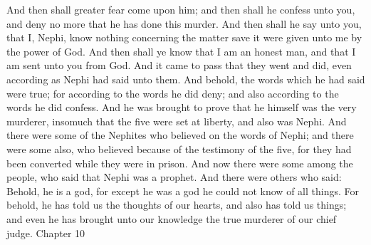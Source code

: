 And then shall greater fear come upon him; and then shall he confess unto you, and deny no more that he has done this murder.
\bverse \iffalse And then shall he say unto you, that I, Nephi, know nothing concerning the matter save it were given unto me by the power of God. And then shall ye know that I am an honest man, and that I am sent unto you from God. \fi
And then shall he say unto you, that I, Nephi, know nothing concerning the matter save it were given unto me by the power of God. And then shall ye know that I am an honest man, and that I am sent unto you from God.
\bverse \iffalse And it came to pass that they went and did, even according as Nephi had said unto them. And behold, the words which he had said were true; for according to the words he did deny; and also according to the words he did confess. \fi
And it came to pass that they went and did, even according as Nephi had said unto them. And behold, the words which he had said were true; for according to the words he did deny; and also according to the words he did confess.
\bverse \iffalse And he was brought to prove that he himself was the very murderer, insomuch that the five were set at liberty, and also was Nephi. \fi
And he was brought to prove that he himself was the very murderer, insomuch that the five were set at liberty, and also was Nephi.
\bverse \iffalse And there were some of the Nephites who believed on the words of Nephi; and there were some also, who believed because of the testimony of the five, for they had been converted while they were in prison. \fi
And there were some of the Nephites who believed on the words of Nephi; and there were some also, who believed because of the testimony of the five, for they had been converted while they were in prison.
\bverse \iffalse And now there were some among the people, who said that Nephi was a prophet. \fi
And now there were some among the people, who said that Nephi was a prophet.
\bverse \iffalse And there were others who said: Behold, he is a god, for except he was a god he could not know of all things. For behold, he has told us the thoughts of our hearts, and also has told us things; and even he has brought unto our knowledge the true murderer of our chief judge. \fi
And there were others who said: Behold, he is a god, for except he was a god he could not know of all things. For behold, he has told us the thoughts of our hearts, and also has told us things; and even he has brought unto our knowledge the true murderer of our chief judge.
Chapter 10
